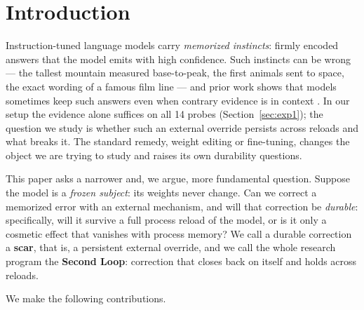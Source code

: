 \documentclass[11pt]{article}
\begin{document}
\section{Introduction}

Instruction-tuned language models carry \emph{memorized instincts}: firmly
encoded answers that the model emits with high confidence. Such instincts can
be wrong --- the tallest mountain measured base-to-peak, the first animals sent
to space, the exact wording of a famous film line --- and prior work shows that
models sometimes keep such answers even when contrary evidence is in context
\citep{longpre2021entity, xie2024adaptive}. In our setup the evidence alone
suffices on all 14 probes (Section~\ref{sec:exp1}); the question we study is
whether such an external override persists across reloads and what breaks it. The standard remedy,
weight editing or fine-tuning, changes the object we are trying to study and
raises its own durability questions.

This paper asks a narrower and, we argue, more fundamental question. Suppose the
model is a \emph{frozen subject}: its weights never change. Can we correct a
memorized error with an external mechanism, and will that correction be
\emph{durable}: specifically, will it survive a full process reload of the
model, or is it only a cosmetic effect that vanishes with process memory? We
call a durable correction a \textbf{scar}, that is, a persistent external
override, and we call the whole research program
the \textbf{Second Loop}: correction that closes back on itself and holds across
reloads.

We make the following contributions.
\end{document}
